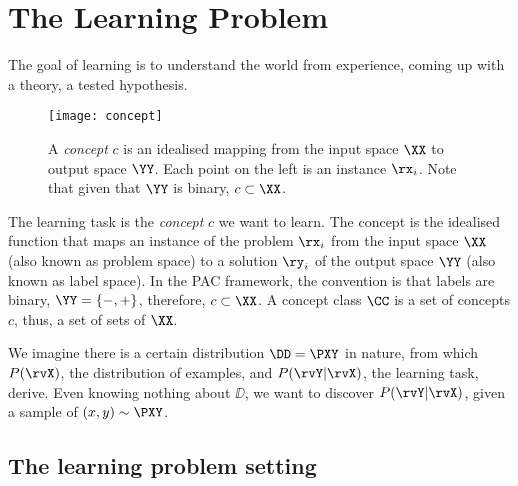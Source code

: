 \section {The Learning Problem}
The goal of learning is to understand the world from experience, coming up with a theory, a tested hypothesis.

\begin{figure}[ht]
	\centering
	\texttt{[image: concept]}
	\caption{A \emph{concept} \(c\) is an idealised mapping from the input space \(\XX\) to output space \(\YY\). Each point on the left is an instance \(\rx_i\). Note that given that \(\YY\) is binary, \(c \subset \XX\).}
\end{figure}

The learning task is the \emph{concept} \(c\) we want to learn. The concept is the idealised function that maps an instance of the problem \(\rx_i\) from the input space \(\XX\) (also known as problem space) to a solution \(\ry_i\) of the output space \(\YY\) (also known as label space). In the PAC framework, the convention is that labels are binary, \(\YY = \{-, +\}\), therefore, \(c \subset \XX\). A concept class \(\CC\) is a set of concepts \(c\), thus, a set of sets of \(\XX\).

We imagine there is a certain distribution \(\DD = \PXY \) in nature, from which \(P(\rvX)\), the distribution of examples, and \(P(\rvY|\rvX)\), the learning task, derive. Even knowing nothing about \(\DD\), we want to discover \(P(\rvY|\rvX)\), given a sample of \((x, y) \sim \PXY\).

\subsection{The learning problem setting}

